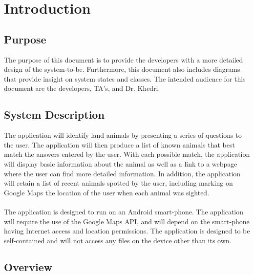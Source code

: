 \documentclass[]{article}
\begin{document}
\tableofcontents
\cleardoublepage
{}

\section{Introduction}
\label{sec:introduction}


\subsection{Purpose}
\label{sub:purpose}

The purpose of this document is to provide the developers with a more detailed design of the system-to-be. Furthermore, this document also includes diagrams that provide insight on system states and classes. The intended audience for this document are the developers, TA's, and Dr. Khedri.


\subsection{System Description}
\label{sub:system_description}

The application will identify land animals by presenting a series of questions to the user. The application will then produce a list of known animals that best match the answers entered by the user. With each possible match, the application will display basic information about the animal as well as a link to a webpage where the user can find more detailed information. In addition, the application will retain a list of recent animals spotted by the user, including marking on Google Maps the location of the user when each animal was sighted.
\\
\\
The application is designed to run on an Android smart-phone. The application will require the use of the Google Maps API, and will depend on the smart-phone having Internet access and location permissions. The application is designed to be self-contained and will not access any files on the device other than its own.


\subsection{Overview}
\label{sub:overview}
\end{document}
